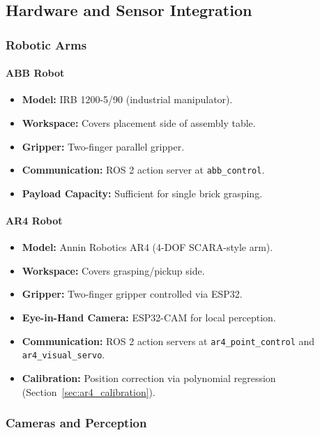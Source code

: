 \subsection{Hardware and Sensor Integration}

\subsubsection{Robotic Arms}

\paragraph{ABB Robot}
\begin{itemize}
    \item \textbf{Model:} IRB 1200-5/90 (industrial manipulator).
    \item \textbf{Workspace:} Covers placement side of assembly table.
    \item \textbf{Gripper:} Two-finger parallel gripper.
    \item \textbf{Communication:} ROS 2 action server at \texttt{abb\_control}.
    \item \textbf{Payload Capacity:} Sufficient for single brick grasping.
\end{itemize}

\paragraph{AR4 Robot}
\begin{itemize}
    \item \textbf{Model:} Annin Robotics AR4 (4-DOF SCARA-style arm).
    \item \textbf{Workspace:} Covers grasping/pickup side.
    \item \textbf{Gripper:} Two-finger gripper controlled via ESP32.
    \item \textbf{Eye-in-Hand Camera:} ESP32-CAM for local perception.
    \item \textbf{Communication:} ROS 2 action servers at \texttt{ar4\_point\_control} and \texttt{ar4\_visual\_servo}.
    \item \textbf{Calibration:} Position correction via polynomial regression (Section~\ref{sec:ar4_calibration}).
\end{itemize}

\subsubsection{Cameras and Perception}

